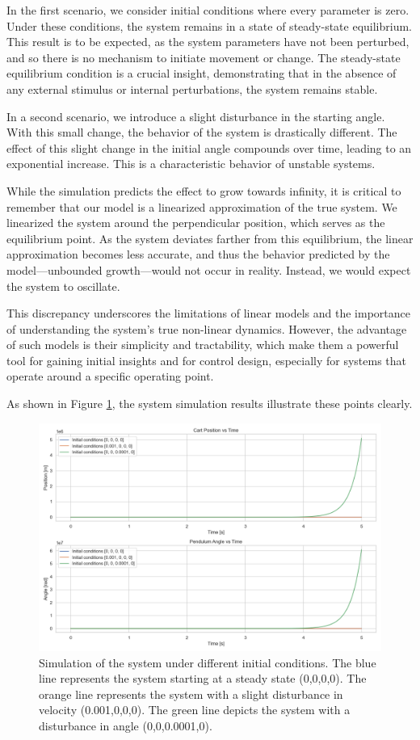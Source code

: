 \documentclass[11pt,twocolumn,twoside,lineno]{pnas-new}
\begin{document}
In the first scenario, we consider initial conditions where every parameter is zero. Under these conditions, the system remains in a state of steady-state equilibrium. This result is to be expected, as the system parameters have not been perturbed, and so there is no mechanism to initiate movement or change. The steady-state equilibrium condition is a crucial insight, demonstrating that in the absence of any external stimulus or internal perturbations, the system remains stable.

In a second scenario, we introduce a slight disturbance in the starting angle. With this small change, the behavior of the system is drastically different. The effect of this slight change in the initial angle compounds over time, leading to an exponential increase. This is a characteristic behavior of unstable systems. 

While the simulation predicts the effect to grow towards infinity, it is critical to remember that our model is a linearized approximation of the true system. We linearized the system around the perpendicular position, which serves as the equilibrium point. As the system deviates farther from this equilibrium, the linear approximation becomes less accurate, and thus the behavior predicted by the model—unbounded growth—would not occur in reality. Instead, we would expect the system to oscillate.

This discrepancy underscores the limitations of linear models and the importance of understanding the system's true non-linear dynamics. However, the advantage of such models is their simplicity and tractability, which make them a powerful tool for gaining initial insights and for control design, especially for systems that operate around a specific operating point.

As shown in Figure \ref{fig:system_sim}, the system simulation results illustrate these points clearly.

\begin{figure}[h]
\centering
\includegraphics[width=\linewidth]{simulations/system_simulation.png}
\caption{Simulation of the system under different initial conditions. The blue line represents the system starting at a steady state (0,0,0,0). The orange line represents the system with a slight disturbance in velocity (0.001,0,0,0). The green line depicts the system with a disturbance in angle (0,0,0.0001,0).}
\label{fig:system_sim}
\end{figure}
\end{document}
